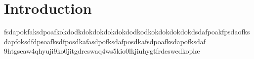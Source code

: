 \chapter{Introduction}
fsdapokfaksdpoafkokdodkdokdokdokdokdodkodkokdokdokdokdsdafpoakfpsdaofksdapfoksdfdpsoafksdfposdkafasdpofksdafposdkafsdpoafksdapofksdaf
9htgseaw4qhyuji9ko0jitgdreswaq4ws5kio0lkjiuhygtfrdeswedkoplæ
